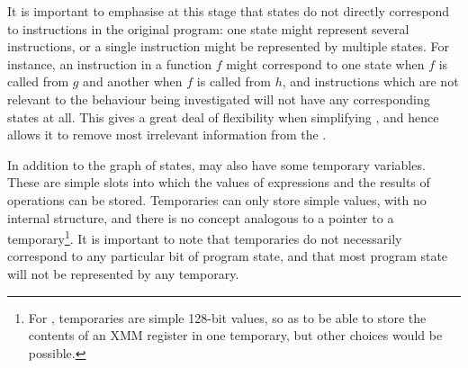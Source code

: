 It is important to emphasise at this stage that {\StateMachines}
states do not directly correspond to instructions in the original
program: one state might represent several instructions, or a single
instruction might be represented by multiple states.  For instance, an
instruction in a function $f$ might correspond to one state when $f$
is called from $g$ and another when $f$ is called from $h$, and
instructions which are not relevant to the behaviour being
investigated will not have any corresponding states at all.  This
gives {\technique} a great deal of flexibility when simplifying
{\StateMachines}, and hence allows it to remove most irrelevant
information from the {\StateMachine}.

In addition to the graph of states, {\StateMachines} may also have
some temporary variables.  These are simple slots into which the
values of expressions and the results of  operations can
be stored.  Temporaries can only store simple values, with no internal
structure, and there is no concept analogous to a pointer to a
temporary\footnote{For {\implementation}, {\StateMachine} temporaries
  are simple 128-bit values, so as to be able to store the contents of
  an XMM register in one temporary, but other choices would be
  possible.}.  It is important to note that {\StateMachine}
temporaries do not necessarily correspond to any particular bit of
program state, and that most program state will not be represented by
any temporary.


